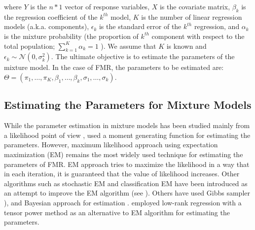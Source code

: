 \documentclass[12pt]{article}
\begin{document}

\noindent 
where $Y$ is the $n*1$ vector of response variables, $X$ is the covariate matrix, $\beta_k$ is the regression coefficient of the $k^{th}$ model, $K$ is the number of linear regression models (a.k.a. components), $\epsilon_k$ is the standard error of the $k^{th}$ regression, and $\alpha_k$ is the mixture probability (the proportion of $k^{th}$ component with respect to the total population; $\sum_{k=1}^{K} \alpha_k=1$ ). We assume that $K$ is known and $\epsilon_k \sim \mathcal{N}(0,\sigma_k^2)$. The ultimate objective is to estimate the parameters of the mixture model. In the case of FMR, the parameters to be estimated are: $\Theta = (\pi_1, \dots , \pi_K, \beta_1, \dots, \beta_k, \sigma_1, \dots, \sigma_k)$.

\subsection{Estimating the Parameters for Mixture Models}
While the parameter estimation in mixture models has been studied mainly from a likelihood point of view \citep{de1989mixtures}, \citep{quandt1978estimating} used a moment generating function for estimating the parameters. However, maximum likelihood approach using expectation maximization (EM) \citep{dempster1977maximum} remains the most widely used technique for estimating the parameters of FMR. EM approach tries to maximize the likelihood in a way that in each iteration, it is guaranteed that the value of likelihood increases. 
Other algorithms such as stochastic EM \citep{celeux1985sem} and classification EM \citep{celeux1992classification} have been introduced as an attempt to improve the EM algorithm (see \citep{faria2010fitting}). Others have used Gibbs sampler \citep{diebolt1994estimation}), and Bayesian approach for estimation \citep{hurn2003estimating}. \citep{chaganty2013spectral} employed low-rank regression with a tensor power method as an alternative to EM algorithm for estimating the parameters. 
\end{document}
